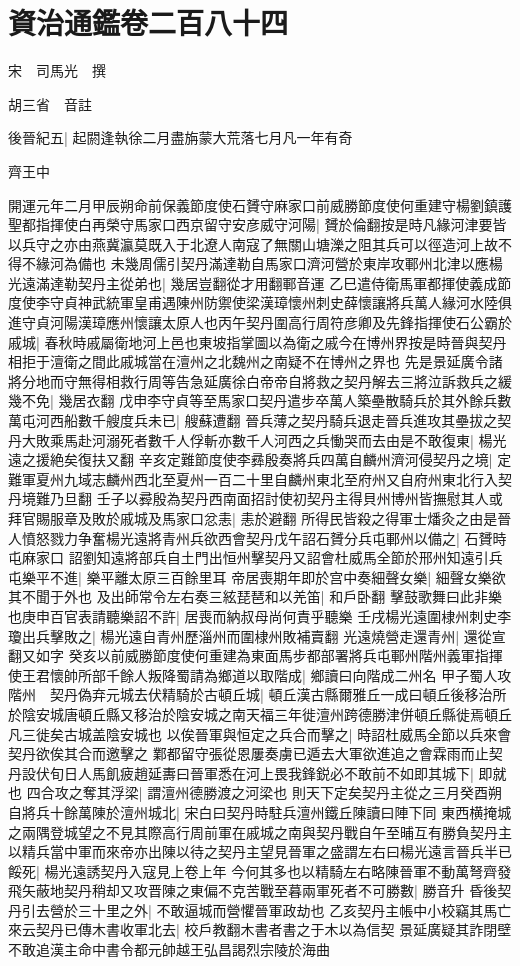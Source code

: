 \section{資治通鑑卷二百八十四}
宋　司馬光　撰

胡三省　音註

後晉紀五|{
	起閼逢執徐二月盡旃蒙大荒落七月凡一年有奇}


齊王中

開運元年二月甲辰朔命前保義節度使石贇守麻家口前威勝節度使何重建守楊劉鎮護聖都指揮使白再榮守馬家口西京留守安彦威守河陽|{
	贇於倫翻按是時凡緣河津要皆以兵守之亦由燕冀瀛莫既入于北遼人南寇了無關山塘濼之阻其兵可以徑造河上故不得不緣河為備也}
未幾周儒引契丹滿達勒自馬家口濟河營於東岸攻鄆州北津以應楊光遠滿達勒契丹主從弟也|{
	幾居豈翻從才用翻鄆音運}
乙巳遣侍衛馬軍都揮使義成節度使李守貞神武統軍皇甫遇陳州防禦使梁漢璋懷州刺史薛懷讓將兵萬人緣河水陸俱進守貞河陽漢璋應州懷讓太原人也丙午契丹圍高行周符彦卿及先鋒指揮使石公霸於戚城|{
	春秋時戚屬衛地河上邑也東坡指掌圖以為衛之戚今在博州界按是時晉與契丹相拒于澶衛之間此戚城當在澶州之北魏州之南疑不在博州之界也}
先是景延廣令諸將分地而守無得相救行周等告急延廣徐白帝帝自將救之契丹解去三將泣訴救兵之緩幾不免|{
	幾居衣翻}
戊申李守貞等至馬家口契丹遣步卒萬人築壘散騎兵於其外餘兵數萬屯河西船數千艘度兵未已|{
	艘蘇遭翻}
晉兵薄之契丹騎兵退走晉兵進攻其壘拔之契丹大敗乘馬赴河溺死者數千人俘斬亦數千人河西之兵慟哭而去由是不敢復東|{
	楊光遠之援絶矣復扶又翻}
辛亥定難節度使李彞殷奏將兵四萬自麟州濟河侵契丹之境|{
	定難軍夏州九域志麟州西北至夏州一百二十里自麟州東北至府州又自府州東北行入契丹境難乃旦翻}
壬子以彛殷為契丹西南面招討使初契丹主得貝州博州皆撫慰其人或拜官賜服章及敗於戚城及馬家口忿恚|{
	恚於避翻}
所得民皆殺之得軍士燔灸之由是晉人憤怒戮力争奮楊光遠將青州兵欲西會契丹戊午詔石贇分兵屯鄆州以備之|{
	石贇時屯麻家口}
詔劉知遠將部兵自土門出恒州擊契丹又詔會杜威馬全節於邢州知遠引兵屯樂平不進|{
	樂平離太原三百餘里耳}
帝居喪期年即於宫中奏細聲女樂|{
	細聲女樂欲其不聞于外也}
及出師常令左右奏三絃琵琶和以羌笛|{
	和戶卧翻}
擊鼓歌舞曰此非樂也庚申百官表請聽樂詔不許|{
	居喪而納叔母尚何責乎聽樂}
壬戌楊光遠圍棣州刺史李瓊出兵擊敗之|{
	楊光遠自青州歷淄州而圍棣州敗補賣翻}
光遠燒營走還青州|{
	還從宣翻又如字}
癸亥以前威勝節度使何重建為東面馬步都部署將兵屯鄆州階州義軍指揮使王君懷帥所部千餘人叛降蜀請為鄉道以取階成|{
	鄉讀曰向階成二州名}
甲子蜀人攻階州　契丹偽弃元城去伏精騎於古頓丘城|{
	頓丘漢古縣爾雅丘一成曰頓丘後移治所於陰安城唐頓丘縣又移治於陰安城之南天福三年徙澶州跨德勝津併頓丘縣徙焉頓丘凡三徙矣古城盖陰安城也}
以俟晉軍與恒定之兵合而擊之|{
	時詔杜威馬全節以兵來會契丹欲俟其合而邀擊之}
鄴都留守張從恩屢奏虜已遁去大軍欲進追之會霖雨而止契丹設伏旬日人馬飢疲趙延夀曰晉軍悉在河上畏我鋒鋭必不敢前不如即其城下|{
	即就也}
四合攻之奪其浮梁|{
	謂澶州德勝渡之河梁也}
則天下定矣契丹主從之三月癸酉朔自將兵十餘萬陳於澶州城北|{
	宋白曰契丹時駐兵澶州鐵丘陳讀曰陣下同}
東西横掩城之兩隅登城望之不見其際高行周前軍在戚城之南與契丹戰自午至晡互有勝負契丹主以精兵當中軍而來帝亦出陳以待之契丹主望見晉軍之盛謂左右曰楊光遠言晉兵半已餒死|{
	楊光遠誘契丹入寇見上卷上年}
今何其多也以精騎左右略陳晉軍不動萬弩齊發飛矢蔽地契丹稍却又攻晋陳之東偏不克苦戰至暮兩軍死者不可勝數|{
	勝音升}
昏後契丹引去營於三十里之外|{
	不敢逼城而營懼晉軍政劫也}
乙亥契丹主帳中小校竊其馬亡來云契丹已傳木書收軍北去|{
	校戶教翻木書者書之于木以為信契}
景延廣疑其詐閉壁不敢追漢主命中書令都元帥越王弘昌謁烈宗陵於海曲


